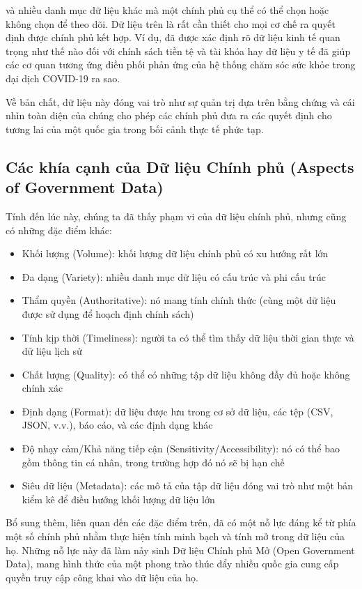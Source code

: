 và nhiều danh mục dữ liệu khác mà một chính phủ cụ thể có thể chọn hoặc không chọn để theo dõi. Dữ liệu trên là rất cần thiết cho mọi cơ chế ra quyết định được chính phủ kết hợp. Ví dụ, đã được xác định rõ dữ liệu kinh tế quan trọng như thế nào đối với chính sách tiền tệ và tài khóa hay dữ liệu y tế đã giúp các cơ quan tương ứng điều phối phản ứng của hệ thống chăm sóc sức khỏe trong đại dịch COVID-19 ra sao.

Về bản chất, dữ liệu này đóng vai trò như sự quản trị dựa trên bằng chứng và cái nhìn toàn diện của chúng cho phép các chính phủ đưa ra các quyết định cho tương lai của một quốc gia trong bối cảnh thực tế phức tạp.

\subsection[Các khía cạnh của Dữ liệu Chính phủ]{Các khía cạnh của Dữ liệu Chính phủ (Aspects of Government Data)}

Tính đến lúc này, chúng ta đã thấy phạm vi của dữ liệu chính phủ, nhưng cũng có những đặc điểm khác:
\begin{itemize}
    \item Khối lượng (Volume): khối lượng dữ liệu chính phủ có xu hướng rất lớn
    \item Đa dạng (Variety): nhiều danh mục dữ liệu có cấu trúc và phi cấu trúc
    \item Thẩm quyền (Authoritative): nó mang tính chính thức (cùng một dữ liệu được sử dụng để hoạch định chính sách)
    \item Tính kịp thời (Timeliness): người ta có thể tìm thấy dữ liệu thời gian thực và dữ liệu lịch sử
    \item Chất lượng (Quality): có thể có những tập dữ liệu không đầy đủ hoặc không chính xác
    \item Định dạng (Format): dữ liệu được lưu trong cơ sở dữ liệu, các tệp (CSV, JSON, v.v.), báo cáo, và các định dạng khác
    \item Độ nhạy cảm/Khả năng tiếp cận (Sensitivity/Accessibility): nó có thể bao gồm thông tin cá nhân, trong trường hợp đó nó sẽ bị hạn chế
    \item Siêu dữ liệu (Metadata): các mô tả của tập dữ liệu đóng vai trò như một bản kiểm kê để điều hướng khối lượng dữ liệu lớn
\end{itemize}

Bổ sung thêm, liên quan đến các đặc điểm trên, đã có một nỗ lực đáng kể từ phía một số chính phủ nhằm thực hiện tính minh bạch và tính mở trong dữ liệu của họ. Những nỗ lực này đã làm nảy sinh Dữ liệu Chính phủ Mở (Open Government Data), mang hình thức của một phong trào thúc đẩy nhiều quốc gia cung cấp quyền truy cập công khai vào dữ liệu của họ.

